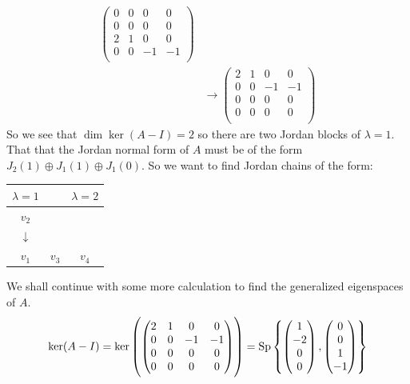 \documentclass[11pt, a4paper]{article}
\begin{document}
\begin{solution}
\begin{align*}
\begin{pmatrix}
    0 & 0 & 0 & 0\\
    0 & 0 & 0 & 0\\
    2 & 1 & 0 & 0\\
    0 & 0 & -1 & -1\\
  \end{pmatrix} \\ &\to
  \begin{pmatrix}
    2 & 1 & 0 & 0\\
    0 & 0 & -1 & -1\\
    0 & 0 & 0 & 0\\
    0 & 0 & 0 & 0\\
  \end{pmatrix}
  \end{align*}
  So we see that $\dim\ker(A-I) = 2$ so there are two Jordan blocks of 
  $\lambda = 1$. That that the Jordan normal form of $A$ must be
  of the form $J_2(1) \oplus J_1(1) \oplus J_1(0)$. So we want to find
  Jordan chains of the form:
  \begin{center}
  \begin{tabular}{c c | c} 
   $\lambda=1$ &  & $\lambda=2$ \\
   \hline
   $v_2$ &  &  \\ 
   $\downarrow$ &  &  \\
   $v_1$ & $v_3$ & $v_4$ \\
  \end{tabular}
  \end{center}
  We shall continue with some more calculation to find the generalized
  eigenspaces of $A$.	
  \[
    \ker(A-I) = \ker\left(
    \begin{pmatrix}
    2 & 1 & 0 & 0\\
    0 & 0 & -1 & -1\\
    0 & 0 & 0 & 0\\
    0 & 0 & 0 & 0\\
    \end{pmatrix}\right) = 
    \mathrm{Sp}
    \left\{ \begin{pmatrix} 1\\ -2\\ 0\\ 0\\ \end{pmatrix},
       \begin{pmatrix} 0\\ 0\\ 1\\ -1\\ \end{pmatrix} \right\}
\]
\end{solution}
\end{document}
